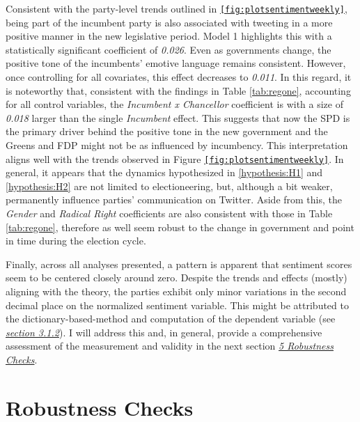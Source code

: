 \documentclass[a4paper,11pt]{article}
\begin{document}
Consistent with the party-level trends outlined in \texttt{\ref{fig:plotsentimentweekly}}, being part of the incumbent party is also associated with tweeting in a more positive manner in the new legislative period. Model 1 highlights this with a statistically significant coefficient of \emph{0.026}. Even as governments change, the positive tone of the incumbents' emotive language remains consistent. However, once controlling for all covariates, this effect decreases to \emph{0.011}. In this regard, it is noteworthy that, consistent with the findings in Table \ref{tab:regone}, accounting for all control variables, the \emph{Incumbent x Chancellor} coefficient is with a size of \emph{0.018} larger than the single \emph{Incumbent} effect. This suggests that now the SPD is the primary driver behind the positive tone in the new government and the Greens and FDP might not be as influenced by incumbency. This interpretation aligns well with the trends observed in Figure \texttt{\ref{fig:plotsentimentweekly}}. In general, it appears that the dynamics hypothesized in \ref{hypothesis:H1} and \ref{hypothesis:H2} are not limited to electioneering, but, although a bit weaker, permanently influence parties' communication on Twitter. Aside from this, the \emph{Gender} and \emph{Radical Right} coefficients are also consistent with those in Table \ref{tab:regone}, therefore as well seem robust to the change in government and point in time during the election cycle.

Finally, across all analyses presented, a pattern is apparent that sentiment scores seem to be centered closely around zero. Despite the trends and effects (mostly) aligning with the theory, the parties exhibit only minor variations in the second decimal place on the normalized sentiment variable. This might be attributed to the dictionary-based-method and computation of the dependent variable (see \protect\hyperlink{dv}{\emph{section 3.1.2}}). I will address this and, in general, provide a comprehensive assessment of the measurement and validity in the next section \protect\hyperlink{robustness}{\emph{5 Robustness Checks}}.

\hypertarget{robustness}{%
\section{Robustness Checks}\label{robustness}}
\end{document}
